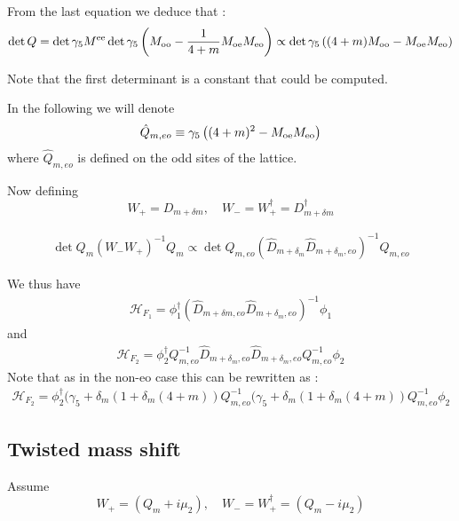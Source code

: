 \documentclass{article}[12pt]
\begin{document}
From the last equation we deduce that :
\begin{equation}
\det{Q} = \det{\gamma_5 M^{\rm{ee}}} \det{\gamma_5  \left(M_{\rm{oo}}
    -\frac{1}{4+m} M_{\rm{oe}}     M_{\rm{eo}} \right)} \propto
\det{\gamma_5  \left((4+m) M_{\rm{oo}}
    - M_{\rm{oe}}     M_{\rm{eo}} \right)}
\end{equation}

Note that the first determinant is a constant that could be computed.

In the following we will denote
\begin{equation}
\hat{Q}_{m,eo} \equiv \gamma_5
  \left((4+m)^2 - M_{\rm{oe}}  M_{\rm{eo}} \right)
\end{equation}
where $\hat{Q}_{m,eo}$ is defined on the odd sites of the lattice.



Now defining
\begin{equation}
W_{+} = D_{m+\delta m} ,\quad W_{-} =
W_{+}^\dagger=   D^{\dagger}_{m+\delta m}
\end{equation}

\begin{eqnarray}
\det{ Q_m (W_-  W_+)^{-1}  Q_m} \propto \det{ Q_{m,eo} (\hat{D}_{m+\delta_m}
  \hat{D}_{m+\delta_m,eo}  )^{-1}  Q_{m,eo}}
\end{eqnarray}


We thus have
\begin{eqnarray}
\mathcal{H}_{F_1} = \phi_1^\dagger \left( \hat{D}_{m+\delta m,eo} \hat{D}_{m+\delta_m,eo} \right)^{-1}\phi_1
\end{eqnarray}
and
\begin{eqnarray}
\mathcal{H}_{F_2} = \phi_2^\dagger Q_{m,eo}^{-1} \hat{D}_{m+\delta_m,eo} \hat{D}_{m+\delta_m,eo} Q_{m,eo}^{-1}\phi_2
\end{eqnarray}
Note that as in the non-eo case this can be rewritten as :
\begin{eqnarray}
\mathcal{H}_{F_2} =\phi_2^{\dagger} (\gamma_5 + \delta_m (1 +
\delta_m (4+m) )Q_{m,eo}^{-1}   (\gamma_5 + \delta_m (1 +
\delta_m (4+m) )Q_{m,eo}^{-1}\phi_2
\end{eqnarray}

\subsection{Twisted mass shift}
Assume
\begin{equation}
W_{+} = \left( Q_m + i \mu_2  \right) ,\quad W_{-} = W_+^{\dagger}=
  \left( Q_m - i \mu_2 \right)
\end{equation}
\end{document}
